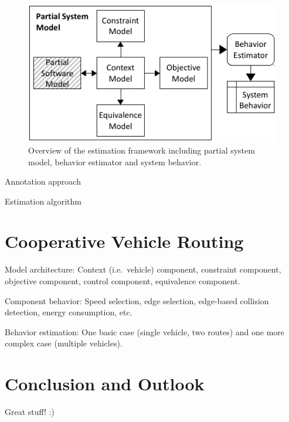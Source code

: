 \documentclass[conference]{../cls/IEEEtran}
\begin{document}
\begin{figure}[b]
	\centering
	\includegraphics{../gfx/framework.pdf}
	\caption{Overview of the estimation framework including partial system model, behavior estimator and system behavior.}
\end{figure}

Annotation approach \cite{Hackenberg2012}

Estimation algorithm

\section{Cooperative Vehicle Routing}

Model architecture: Context (i.e.\ vehicle) component, constraint component, objective component, control component, equivalence component.

Component behavior: Speed selection, edge selection, edge-based collision detection, energy consumption, etc.

Behavior estimation: One basic case (single vehicle, two routes) and one more complex case (multiple vehicles).

\section{Conclusion and Outlook}

Great stuff! :)



\end{document}
